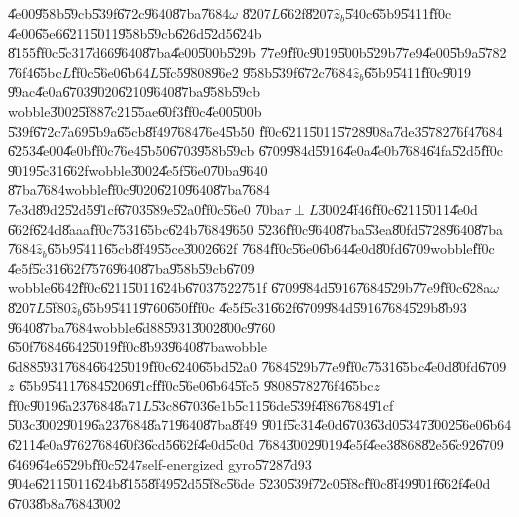 \U{4e00}\U{958b}\U{59cb}\U{539f}\U{672c}\U{9640}\U{87ba}\U{7684}$\omega $%
\U{8207}$L$\U{662f}\U{8207}$\hat{z}_{b}$\U{540c}\U{65b9}\U{5411}\U{ff0c}%
\U{4e00}\U{65e6}\U{6211}\U{5011}\U{958b}\U{59cb}\U{626d}\U{52d5}\U{624b}%
\U{8155}\U{ff0c}\U{5c31}\U{7d66}\U{9640}\U{87ba}\U{4e00}\U{500b}\U{529b}%
\U{77e9}\U{ff0c}\U{9019}\U{500b}\U{529b}\U{77e9}\U{4e00}\U{5b9a}\U{5782}%
\U{76f4}\U{65bc}$L$\U{ff0c}\U{56e0}\U{6b64}$L$\U{5fc5}\U{9808}\U{96e2}%
\U{958b}\U{539f}\U{672c}\U{7684}$\hat{z}_{b}$\U{65b9}\U{5411}\U{ff0c}\U{9019}%
\U{99ac}\U{4e0a}\U{6703}\U{9020}\U{6210}\U{9640}\U{87ba}\U{958b}\U{59cb}%
wobble\U{3002}\U{5f88}\U{7c21}\U{55ae}\U{60f3}\U{ff0c}\U{4e00}\U{500b}%
\U{539f}\U{672c}\U{7a69}\U{5b9a}\U{65cb}\U{8f49}\U{7684}\U{76e4}\U{5b50}%
\U{ff0c}\U{6211}\U{5011}\U{5728}\U{908a}\U{7de3}\U{5782}\U{76f4}\U{7684}%
\U{6253}\U{4e00}\U{4e0b}\U{ff0c}\U{76e4}\U{5b50}\U{6703}\U{958b}\U{59cb}%
\U{6709}\U{984d}\U{5916}\U{4e0a}\U{4e0b}\U{7684}\U{64fa}\U{52d5}\U{ff0c}%
\U{9019}\U{5c31}\U{662f}wobble\U{3002}\U{4e5f}\U{56e0}\U{70ba}\U{9640}%
\U{87ba}\U{7684}wobble\U{ff0c}\U{9020}\U{6210}\U{9640}\U{87ba}\U{7684}%
\U{7e3d}\U{89d2}\U{52d5}\U{91cf}\U{6703}\U{589e}\U{52a0}\U{ff0c}\U{56e0}%
\U{70ba}$\tau \perp L$\U{3002}\U{4f46}\U{ff0c}\U{6211}\U{5011}\U{4e0d}%
\U{662f}\U{624d}\U{8aaa}\U{ff0c}\U{7531}\U{65bc}\U{624b}\U{7684}\U{9650}%
\U{5236}\U{ff0c}\U{9640}\U{87ba}\U{53ea}\U{80fd}\U{5728}\U{9640}\U{87ba}%
\U{7684}$\hat{z}_{b}$\U{65b9}\U{5411}\U{65cb}\U{8f49}\U{55ce}\U{3002}\U{662f}%
\U{7684}\U{ff0c}\U{56e0}\U{6b64}\U{4e0d}\U{80fd}\U{6709}wobble\U{ff0c}%
\U{4e5f}\U{5c31}\U{662f}\U{7576}\U{9640}\U{87ba}\U{958b}\U{59cb}\U{6709}%
wobble\U{6642}\U{ff0c}\U{6211}\U{5011}\U{624b}\U{6703}\U{7522}\U{751f}%
\U{6709}\U{984d}\U{5916}\U{7684}\U{529b}\U{77e9}\U{ff0c}\U{628a}$\omega $%
\U{8207}$L$\U{5f80}$\hat{z}_{b}$\U{65b9}\U{5411}\U{9760}\U{650f}\U{ff0c}%
\U{4e5f}\U{5c31}\U{662f}\U{6709}\U{984d}\U{5916}\U{7684}\U{529b}\U{8b93}%
\U{9640}\U{87ba}\U{7684}wobble\U{6d88}\U{5931}\U{3002}\U{800c}\U{9760}%
\U{650f}\U{7684}\U{6642}\U{5019}\U{ff0c}\U{8b93}\U{9640}\U{87ba}wobble%
\U{6d88}\U{5931}\U{7684}\U{6642}\U{5019}\U{ff0c}\U{6240}\U{65bd}\U{52a0}%
\U{7684}\U{529b}\U{77e9}\U{ff0c}\U{7531}\U{65bc}\U{4e0d}\U{80fd}\U{6709}$z$%
\U{65b9}\U{5411}\U{7684}\U{5206}\U{91cf}\U{ff0c}\U{56e0}\U{6b64}\U{5fc5}%
\U{9808}\U{5782}\U{76f4}\U{65bc}$z$\U{ff0c}\U{9019}\U{6a23}\U{7684}\U{8a71}$%
L $\U{53c8}\U{6703}\U{6e1b}\U{5c11}\U{56de}\U{539f}\U{4f86}\U{7684}\U{91cf}%
\U{503c}\U{3002}\U{9019}\U{6a23}\U{7684}\U{8a71}\U{9640}\U{87ba}\U{8f49}%
\U{901f}\U{5c31}\U{4e0d}\U{6703}\U{63d0}\U{5347}\U{3002}\U{56e0}\U{6b64}%
\U{6211}\U{4e0a}\U{9762}\U{7684}\U{60f3}\U{6cd5}\U{662f}\U{4e0d}\U{5c0d}%
\U{7684}\U{3002}\U{9019}\U{4e5f}\U{4ee3}\U{8868}\U{82e5}\U{6c92}\U{6709}%
\U{6469}\U{64e6}\U{529b}\U{ff0c}\U{5247}self-energized gyro\U{5728}\U{7d93}%
\U{904e}\U{6211}\U{5011}\U{624b}\U{8155}\U{8f49}\U{52d5}\U{5f8c}\U{56de}%
\U{5230}\U{539f}\U{72c0}\U{5f8c}\U{ff0c}\U{8f49}\U{901f}\U{662f}\U{4e0d}%
\U{6703}\U{8b8a}\U{7684}\U{3002}

